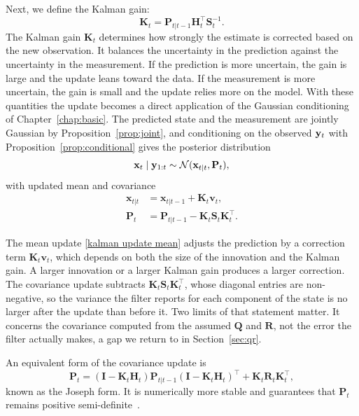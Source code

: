 Next, we define the Kalman gain: 
\begin{equation}\label{eq: Kalman gain}
    \mathbf{K}_t = \mathbf{P}_{t|t-1} \mathbf{H}_t^\top \mathbf{S}_t^{-1}.
\end{equation}
The Kalman gain $\mathbf{K}_t$ determines how strongly the estimate is corrected based on the new observation. It balances the uncertainty in the prediction against the uncertainty in the measurement. If the prediction is more uncertain, the gain is large and the update leans toward the data. If the measurement is more uncertain, the gain is small and the update relies more on the model.
With these quantities the update becomes a direct application of the Gaussian conditioning of Chapter~\ref{chap:basic}. The predicted state and the measurement are jointly Gaussian by Proposition~\ref{prop:joint}, and conditioning on the observed $\mathbf{y}_t$ with Proposition~\ref{prop:conditional} gives the posterior distribution
\begin{equation}
  \mathbf{x}_t \mid \mathbf{y}_{1:t}
  \sim \mathcal{N}(\mathbf{x}_{t|t}, \mathbf{P}_t),
\end{equation}
with updated mean and covariance
\begin{align}
  \mathbf{x}_{t|t} &= \mathbf{x}_{t|t-1} + \mathbf{K}_t \mathbf{v}_t,\label{kalman update mean} \\
  \mathbf{P}_t &= \mathbf{P}_{t|t-1} - \mathbf{K}_t \mathbf{S}_t \mathbf{K}_t^\top.\label{kalman update cov}
\end{align}

The mean update \eqref{kalman update mean} adjusts the prediction by a correction term $\mathbf{K}_t \mathbf{v}_t$, which depends on both the size of the innovation and the Kalman gain. A larger innovation or a larger Kalman gain produces a larger correction. The covariance update subtracts $\mathbf{K}_{t}\mathbf{S}_{t}\mathbf{K}^{\top}_{t}$, whose diagonal entries are non-negative, so the variance the filter reports for each component of the state is no larger after the update than before it. Two limits of that statement matter. It concerns the covariance computed from the assumed $\mathbf{Q}$ and $\mathbf{R}$, not the error the filter actually makes, a gap we return to in Section~\ref{sec:qr}. 

\begin{remark}
An equivalent form of the covariance update is
\[
  \mathbf{P}_t = (\mathbf{I} - \mathbf{K}_t \mathbf{H}_t)\mathbf{P}_{t|t-1}(\mathbf{I} - \mathbf{K}_t \mathbf{H}_t)^\top + \mathbf{K}_t \mathbf{R}_t \mathbf{K}_t^\top,
\]
known as the Joseph form. It is numerically more stable and guarantees that $\mathbf{P}_t$ remains positive semi-definite~\cite[Ch.~7]{labbe:kalman_and_bayesian_filters}.
\end{remark}
          
